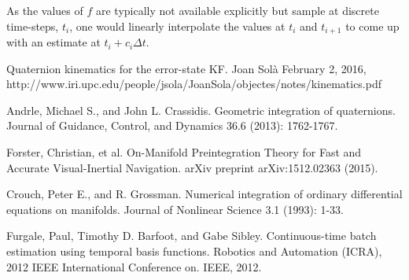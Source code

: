 \documentclass[10pt,a4paper]{article}
\numberwithin{equation}{section}
\begin{document}
As the values of $f$ are typically not available explicitly but sample at discrete time-steps, $t_i$, one would linearly interpolate
the values at $t_i$ and $t_{i+1}$ to come up with an estimate at $t_i + c_i \Delta t$.

\begin{thebibliography}{}

 Quaternion kinematics for the error-state KF. Joan Solà February 2, 2016, http://www.iri.upc.edu/people/jsola/JoanSola/objectes/notes/kinematics.pdf

 Andrle, Michael S., and John L. Crassidis. Geometric integration of quaternions. Journal of Guidance, Control, and Dynamics 36.6 (2013): 1762-1767.

Forster, Christian, et al. On-Manifold Preintegration Theory for Fast and Accurate Visual-Inertial Navigation. arXiv preprint arXiv:1512.02363 (2015).

 Crouch, Peter E., and R. Grossman. Numerical integration of ordinary differential equations on manifolds. Journal of Nonlinear Science 3.1 (1993): 1-33.

 Furgale, Paul, Timothy D. Barfoot, and Gabe Sibley. Continuous-time batch estimation using temporal basis functions. Robotics and Automation (ICRA), 2012 IEEE International Conference on. IEEE, 2012.

\end{thebibliography}
\end{document}
